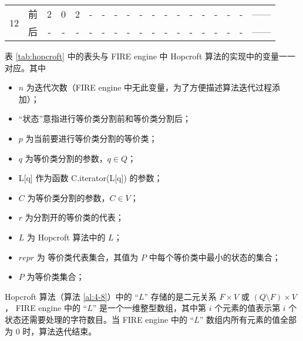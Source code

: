 \begin{table}[!htbp]
\begin{tabular}{ccccccc|cccccccccc|cl}
        \multirow{2}{*}{12}& 前 & 2 & 0 & 2 & - & -  & - & - & - & - & - & - & - & - & - & - & -             & ------ \\
                           & 后 & - & - & - & - & -  & - & - & - & - & - & - & - & - & - & - & -             & ------ \\
        \bottomrule%
    \end{tabular}
\end{table}

表 \ref{tab:hopcroft} 中的表头与 FIRE engine 中 Hopcroft 算法的实现中的变量一一对应。其中
\begin{itemize}
    \item $n$ 为迭代次数（FIRE engine 中无此变量，为了方便描述算法迭代过程添加）；
    \item “状态”意指进行等价类分割前和等价类分割后；
    \item $p$ 为当前要进行等价类分割的等价类；
    \item $q$ 为等价类分割的参数，$q \in Q$；
    \item L[q] 作为函数 C.iterator(L[q]) 的参数；
    \item $C$ 为等价类分割的参数，$C \in V$；
    \item $r$ 为分割开的等价类的代表；
    \item $L$ 为 Hopcroft 算法中的 $L$；
    \item $repr$ 为 等价类代表集合，其值为 $P$ 中每个等价类中最小的状态的集合；
    \item $P$ 为等价类集合；
\end{itemize}

\begin{remark}\label{rem:means-of-L}
    Hopcroft 算法（算法 \ref{al:4-8}）中的 “$L$” 存储的是二元关系 $F \times V$ 或 $(Q \setminus F) \times V$ ， FIRE engine 中的 “$L$” 是一个一维整型数组，其中第 $i$ 个元素的值表示第 $i$ 个状态还需要处理的字符数目。当 FIRE engine 中的 “$L$” 数组内所有元素的值全部为 0 时，算法迭代结束。
\end{remark}